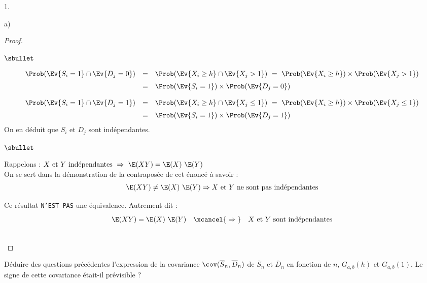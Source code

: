 \begin{noliste}{1.}
\begin{noliste}{a)}
\begin{proof}
\begin{noliste}{$\sbullet$}
        
        \newpage
        
        
        \[
          \begin{array}{rcl}
            \Prob(\Ev{S_i = 1} \cap \Ev{D_j = 0}) & = & \Prob(\Ev{X_i 
	    \geq h} \cap \Ev{X_j > 1}) \ = \ \Prob(\Ev{X_i \geq h}) 
	    \times \Prob(\Ev{X_j > 1}) 
	    \\[.2cm]
	    &=& \Prob(\Ev{S_i=1}) \times \Prob(\Ev{D_j=0})
          \end{array}
        \]
        
        \[
          \begin{array}{rcl}
            \Prob(\Ev{S_i = 1} \cap \Ev{D_j = 1}) & = & \Prob(\Ev{X_i 
	    \geq h} \cap \Ev{X_j \leq 1}) \ = \ \Prob(\Ev{X_i \geq h}) 
	    \times \Prob(\Ev{X_j \leq 1})
	    \\[.2cm]
	    &=& \Prob(\Ev{S_i=1}) \times \Prob(\Ev{D_j=1})
          \end{array}
        \]
        On en déduit que $S_i$ et $D_j$ sont indépendantes.
      \end{noliste}
        
      \begin{remark}%
        \begin{noliste}{$\sbullet$}
        \item Rappelons :
          $
          \mbox{$X$ et $Y$ indépendantes} \ \Rightarrow \ \E(XY) =
          \E(X) \ \E(Y)
          $\\
          On se sert dans la démonstration de la contraposée de cet
          énoncé à savoir : 
          \[
          \E(XY) \neq \E(X) \ \E(Y) \Rightarrow \mbox{$X$ et $Y$ ne
            sont pas indépendantes}
          \]
        \item Ce résultat {\tt N'EST PAS} une équivalence. Autrement
          dit :
          \[
          \E(XY) = \E(X) \ \E(Y) \quad \xcancel{\rule[-.15cm]{0cm}{.5cm}
            \Rightarrow \rule[-.15cm]{0cm}{.5cm}} \quad \mbox{$X$ et
            $Y$ sont indépendantes}
          \]
        \end{noliste}
      \end{remark}~\\[-1.4cm]
    \end{proof}

  \item Déduire des questions précédentes l'expression de la
    covariance $\cov(\overline{S}_n, \overline{D}_n)$ de
    $\overline{S}_n$ et $\overline{D}_n$ en fonction de $n$,
    $G_{a,b}(h)$ et $G_{a,b}(1)$. Le signe de cette covariance
    était-il prévisible ?


\end{noliste}
\end{noliste}
